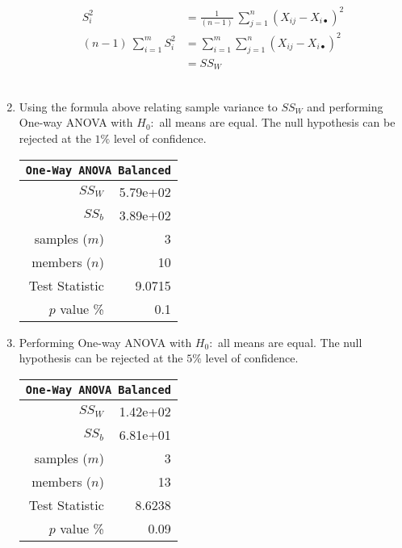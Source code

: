 \begin{enumerate}
	
	\begin{align}
		S_i^2 &= \frac{1}{(n-1)}\ \sum\limits_{j = 1}^{n} (X_{ij} - X_{i\bullet})^2 \nonumber \\
		(n-1)\ \sum\limits_{i = 1}^{m} S_i^2 &= \sum\limits_{i = 1}^{m} \sum\limits_{j = 1}^{n} (X_{ij} - X_{i\bullet})^2 \\
		&= SS_W \nonumber
	\end{align}\\

	\item Using the formula above relating sample variance to $ SS_W $ and performing One-way ANOVA with $ H_0 : $ all means are equal. The null hypothesis can be rejected at the $ 1\% $ level of confidence. \\
	
	\begin{table}[H]
		\centering
		\begin{tabular}{@{}rr@{}}
			\toprule
			\multicolumn{2}{c}{\texttt{One-Way ANOVA Balanced}} \\
			\midrule
			$SS_W$         &               5.79e+02 \\
			$SS_b$         &               3.89e+02 \\
			samples ($m$)  &                      3 \\
			members ($n$)  &                     10 \\
			Test Statistic &                 9.0715 \\
			$p$ value \%   &                    0.1 \\
			\bottomrule
		\end{tabular}
		
		\bigskip
	\end{table}


	\item Performing One-way ANOVA with $ H_0 : $ all means are equal. The null hypothesis can be rejected at the $ 5\% $ level of confidence.
	
	\begin{table}[H]
		\centering
		\begin{tabular}{@{}rr@{}}
			\toprule
			\multicolumn{2}{c}{\texttt{One-Way ANOVA Balanced}} \\
			\midrule
			$SS_W$         &               1.42e+02 \\
			$SS_b$         &               6.81e+01 \\
			samples ($m$)  &                      3 \\
			members ($n$)  &                     13 \\
			Test Statistic &                 8.6238 \\
			$p$ value \%   &                   0.09 \\
			\bottomrule
		\end{tabular}
		

\end{table}
\end{enumerate}
